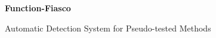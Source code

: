 \begin{frame}
\begin{center}
    \large{\textbf{Function-Fiasco}}



    \vspace{10mm}
    \small{Automatic Detection System for Pseudo-tested Methods}
  \end{center}
\end{frame}
